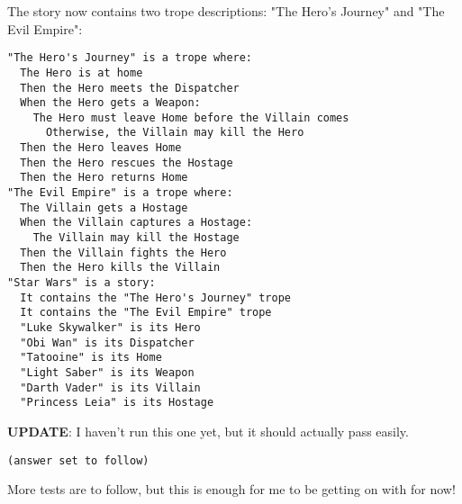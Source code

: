 \documentclass[11pt]{article}
\begin{document}
The story now contains two trope descriptions: "The Hero's Journey" and "The Evil Empire":

\begin{verbatim}
"The Hero's Journey" is a trope where:
  The Hero is at home
  Then the Hero meets the Dispatcher
  When the Hero gets a Weapon:
    The Hero must leave Home before the Villain comes
      Otherwise, the Villain may kill the Hero
  Then the Hero leaves Home
  Then the Hero rescues the Hostage
  Then the Hero returns Home
"The Evil Empire" is a trope where:
  The Villain gets a Hostage
  When the Villain captures a Hostage:
    The Villain may kill the Hostage
  Then the Villain fights the Hero
  Then the Hero kills the Villain
"Star Wars" is a story:
  It contains the "The Hero's Journey" trope
  It contains the "The Evil Empire" trope
  "Luke Skywalker" is its Hero
  "Obi Wan" is its Dispatcher
  "Tatooine" is its Home
  "Light Saber" is its Weapon
  "Darth Vader" is its Villain
  "Princess Leia" is its Hostage
\end{verbatim}

\textbf{UPDATE}: I haven't run this one yet, but it should actually pass easily.

\begin{verbatim}
(answer set to follow)
\end{verbatim}

More tests are to follow, but this is enough for me to be getting on with for now!
\end{document}
